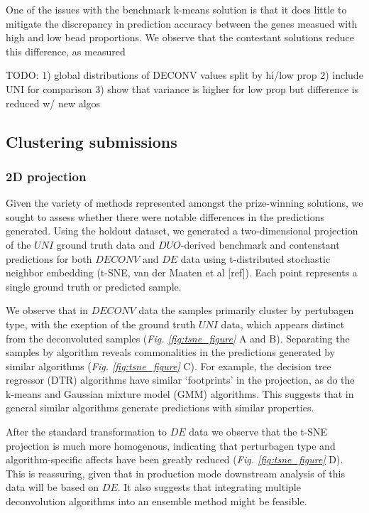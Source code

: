 \documentclass[]{article}
\begin{document}
One of the issues with the benchmark k-means solution is that it does
little to mitigate the discrepancy in prediction accuracy between the
genes measued with high and low bead proportions. We observe that the
contestant solutions reduce this difference, as measured

\color{red}

TODO: 1) global distributions of DECONV values split by hi/low prop 2)
include UNI for comparison 3) show that variance is higher for low prop
but difference is reduced w/ new algos

\color{black}

\hypertarget{clustering-submissions}{%
\subsection{Clustering submissions}\label{clustering-submissions}}

\hypertarget{d-projection}{%
\subsubsection{2D projection}\label{d-projection}}

Given the variety of methods represented amongst the prize-winning
solutions, we sought to assess whether there were notable differences in
the predictions generated. Using the holdout dataset, we generated a
two-dimensional projection of the \(UNI\) ground truth data and
\(DUO\)-derived benchmark and contenstant predictions for both
\(DECONV\) and \(DE\) data using t-distributed stochastic neighbor
embedding (t-SNE, van der Maaten et al {[}ref{]}). Each point represents
a single ground truth or predicted sample.

We observe that in \(DECONV\) data the samples primarily cluster by
pertubagen type, with the exeption of the ground truth \(UNI\) data,
which appears distinct from the deconvoluted samples
({\it Fig. \ref{fig:tsne_figure}} A and B). Separating the samples by
algorithm reveals commonalities in the predictions generated by similar
algorithms ({\it Fig. \ref{fig:tsne_figure}} C). For example, the
decision tree regressor (DTR) algorithms have similar `footprints' in
the projection, as do the k-means and Gaussian mixture model (GMM)
algorithms. This suggests that in general similar algorithms generate
predictions with similar properties.

After the standard transformation to \(DE\) data we observe that the
t-SNE projection is much more homogenous, indicating that perturbagen
type and algorithm-specific affects have been greatly reduced
({\it Fig. \ref{fig:tsne_figure}} D). This is reassuring, given that in
production mode downstream analysis of this data will be based on
\(DE\). It also suggests that integrating multiple deconvolution
algorithms into an ensemble method might be feasible.
\end{document}
